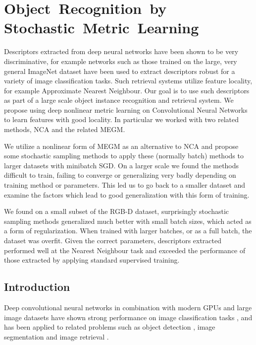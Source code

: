 
\chapter{Object~Recognition~by
      Stochastic~Metric~Learning}



Descriptors extracted from deep neural networks have been shown to be very discriminative,
for example networks such as those trained on the large, very general ImageNet dataset have been used to extract descriptors robust for a variety of image classification tasks. Such retrieval systems utilize feature locality, for example Approximate Nearest Neighbour. Our goal is to use such descriptors as part of a large scale object instance recognition and retrieval system. We propose using deep nonlinear metric learning on Convolutional Neural Networks to learn features with good locality. In particular we worked with two related methods, \gls{NCA} and the related \gls{MEGM}.

We utilize a nonlinear form of \gls{MEGM} as an alternative to \gls{NCA} and propose some stochastic sampling methods to apply these (normally batch) methods to larger datasets with minibatch \gls{SGD}. On a larger scale we found the methods difficult to train, failing to converge or generalizing very badly depending on training method or parameters. This led us to go back to a smaller dataset and examine the factors which lead to good generalization with this form of training.
  
We found on a small subset of the RGB-D dataset, surprisingly stochastic sampling methods generalized much better with small batch sizes, which acted as a form of regularization. When trained with larger batches, or as a full batch, the dataset was overfit. Given the correct parameters, descriptors extracted performed well at the Nearest Neighbour task and exceeded the performance of those extracted by applying standard supervised training.




\section{Introduction}

Deep convolutional neural networks in combination with modern GPUs and large image datasets have shown strong performance on image classification tasks \cite {Krizhevsky2012}, and has been applied to related problems such as object detection \cite{Sermanet2013}, image segmentation \cite{Masci2013} and image retrieval \cite{Razavian2014}.

